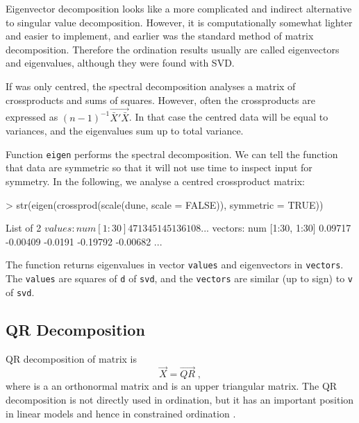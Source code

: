 Eigenvector decomposition looks like a more complicated and indirect
alternative to singular value decomposition. However, it is computationally
somewhat lighter and easier to implement, and earlier was the
standard method of matrix decomposition.  Therefore the ordination
results usually are called eigenvectors and eigenvalues, although they
were found with SVD.

If  was only centred, the spectral decomposition analyses a
matrix of crossproducts and sums of squares. However, often the
crossproducts are expressed as $(n-1)^{-1} \vec{\bar X' \bar X}$.
In that case the centred data will be equal to variances, and the
eigenvalues sum up to total variance.

Function \texttt{eigen} performs the spectral decomposition.  We can
tell the function that data are symmetric so that it will not use time
to inspect input for symmetry. In the following, we analyse a centred
crossproduct matrix:

\begin{Schunk}
\begin{Sinput}
> str(eigen(crossprod(scale(dune, scale = FALSE)), symmetric = TRUE))
\end{Sinput}
\begin{Soutput}
List of 2
 $ values : num [1:30] 471 345 145 136 108 ...
 $ vectors: num [1:30, 1:30] 0.09717 -0.00409 -0.0191 -0.19792 -0.00682 ...
\end{Soutput}
\end{Schunk}
The function returns eigenvalues in vector \texttt{values} and
eigenvectors in \texttt{vectors}.  The \texttt{values} are squares of
\texttt{d} of \texttt{svd}, and the \texttt{vectors} are similar (up
to sign) to \texttt{v} of \texttt{svd}.

\subsection{QR Decomposition}
\label{sec:QR}

QR decomposition of matrix  is
\begin{equation}
  \vec{X} = \vec{QR} \;,
\end{equation}
where  is a an orthonormal matrix and  is an upper
triangular matrix.  The QR decomposition is not directly used in
ordination, but it has an important position in linear models and
hence in constrained ordination \citep{BlueBook}.

